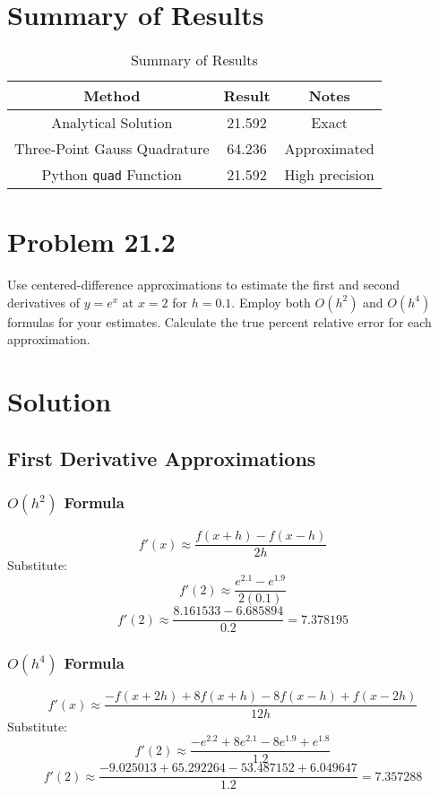\documentclass[11pt]{article}
\begin{document}
\section*{Summary of Results}

\begin{table}[H]
\centering
\begin{tabular}{|c|c|c|}
\hline
\textbf{Method}                   & \textbf{Result} & \textbf{Notes}                \\
\hline
Analytical Solution               & 21.592          & Exact                          \\
Three-Point Gauss Quadrature      & 64.236          & Approximated                   \\
Python \texttt{quad} Function     & 21.592          & High precision                 \\
\hline
\end{tabular}
\caption{Summary of Results}
\end{table}


\section*{Problem 21.2}
Use centered-difference approximations to estimate the first and second derivatives of \( y = e^x \) at \( x = 2 \) for \( h = 0.1 \). Employ both \( O(h^2) \) and \( O(h^4) \) formulas for your estimates. Calculate the true percent relative error for each approximation.

\section*{Solution}

\subsection*{First Derivative Approximations}
\subsubsection*{\( O(h^2) \) Formula}
\[
f'(x) \approx \frac{f(x+h) - f(x-h)}{2h}
\]
Substitute:
\[
f'(2) \approx \frac{e^{2.1} - e^{1.9}}{2(0.1)}
\]
\[
f'(2) \approx \frac{8.161533 - 6.685894}{0.2} = 7.378195
\]

\subsubsection*{\( O(h^4) \) Formula}
\[
f'(x) \approx \frac{-f(x+2h) + 8f(x+h) - 8f(x-h) + f(x-2h)}{12h}
\]
Substitute:
\[
f'(2) \approx \frac{-e^{2.2} + 8e^{2.1} - 8e^{1.9} + e^{1.8}}{1.2}
\]
\[
f'(2) \approx \frac{-9.025013 + 65.292264 - 53.487152 + 6.049647}{1.2} = 7.357288
\]
\end{document}
